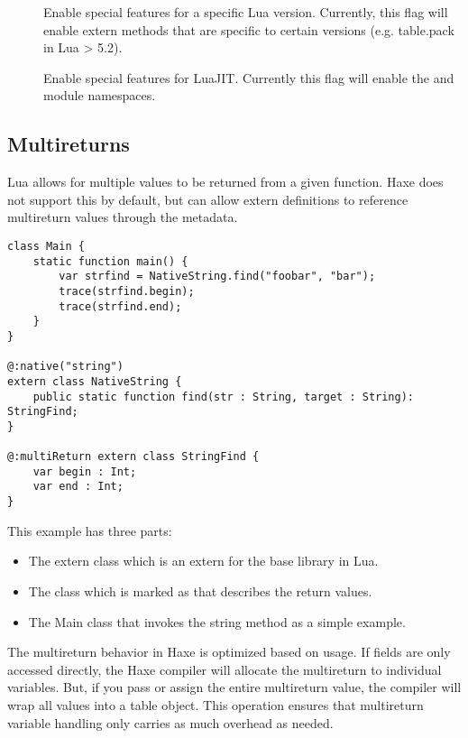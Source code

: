 \begin{description}
	\item[] Enable special features for a specific Lua version. Currently, this flag will enable extern methods that are specific to certain versions (e.g. table.pack in Lua > 5.2).
	\item[] Enable special features for LuaJIT.  Currently this flag will enable the  and  module namespaces.
\end{description}

\subsection{Multireturns}
\label{target-lua-multireturns}

Lua allows for multiple values to be returned from a given function.  Haxe
does not support this by default, but can allow extern definitions to reference
multireturn values through the  metadata.

\begin{lstlisting}
class Main {
    static function main() {
        var strfind = NativeString.find("foobar", "bar");
        trace(strfind.begin);
        trace(strfind.end);
    }
}

@:native("string")
extern class NativeString {
	public static function find(str : String, target : String): StringFind;
}

@:multiReturn extern class StringFind {
	var begin : Int;
	var end : Int;
}
\end{lstlisting}

This example has three parts:

\begin{itemize}
	\item The extern class  which is an extern for the base  library in Lua.
	\item The  class which is marked as  that describes the return values.
	\item The Main class that invokes the string method as a simple example.
\end{itemize}

The multireturn behavior in Haxe is optimized based on usage.  If fields are
only accessed directly, the Haxe compiler will allocate the multireturn to
individual variables.  But, if you pass or assign the entire multireturn value,
the compiler will wrap all values into a table object.  This operation ensures
that multireturn variable handling only carries as much overhead as needed.

